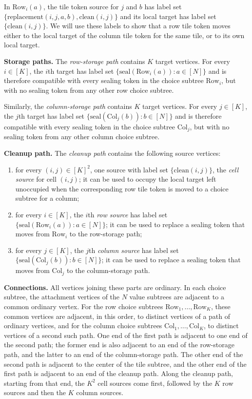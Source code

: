 \documentclass[a4paper,USenglish,thm-restate]{lipics-v2021}
\newcommand{\rowsub}{\mathrm{Row}}
\newcommand{\colsub}{\mathrm{Col}}
\theoremstyle{problemstyle}
\begin{document}
In $\rowsub_i(a)$, the tile token source for $j$ and $b$ has label set
$\{\mathrm{replacement}(i,j,a,b),\mathrm{clean}(i,j)\}$ and its local target
has label set $\{\mathrm{clean}(i,j)\}$. We will use these labels to show
that a row tile token moves either to the local target of the column tile
token for the same tile, or to its own local target.

\smallskip
\noindent\textbf{Storage paths.}
The \emph{row-storage path} contains $K$ target vertices. For every
$i\in[K]$, the $i$th target has label set
$\{\mathrm{seal}(\rowsub_i(a)):a\in[N]\}$ and is therefore compatible with
every sealing token in the choice subtree $\rowsub_i$, but with no sealing
token from any other row choice subtree.

Similarly, the \emph{column-storage path} contains $K$ target vertices. For
every $j\in[K]$, the $j$th target has label set
$\{\mathrm{seal}(\colsub_j(b)):b\in[N]\}$ and is therefore compatible with
every sealing token in the choice subtree $\colsub_j$, but with no sealing
token from any other column choice subtree.

\smallskip
\noindent\textbf{Cleanup path.}
The \emph{cleanup path} contains the following source vertices:
\begin{enumerate}
\item for every $(i,j)\in[K]^2$, one source with label set $\{{\mathrm{clean}(i,j)}\}$, the \emph{cell source} for cell $(i,j)$; it can be used to occupy the local target left unoccupied when the corresponding row tile token is moved to a choice subtree for a column;
\item for every $i\in[K]$, the $i$th \emph{row source} has label set $\{{\mathrm{seal}(\rowsub_i(a)):a\in[N]}\}$; it can be used to replace a sealing token that moves from $\rowsub_i$ to the row-storage path;
\item for every $j\in[K]$, the $j$th \emph{column source} has label set $\{{\mathrm{seal}(\colsub_j(b)):b\in[N]}\}$; it can be used to replace a sealing token that moves from $\colsub_j$ to the column-storage path.
\end{enumerate}

\smallskip
\noindent\textbf{Connections.}
All vertices joining these parts are ordinary. In each choice subtree, the
attachment vertices of the $N$ value subtrees are adjacent to a common
ordinary vertex. For the row choice subtrees $\rowsub_1,\ldots,\rowsub_K$,
these common vertices are adjacent, in this order, to distinct vertices of
a path of ordinary vertices, and for the column choice subtrees
$\colsub_1,\ldots,\colsub_K$, to distinct vertices of a second such path.
One end of the first path is adjacent to one end of the second path; the
former end is also adjacent to an end of the row-storage path, and the
latter to an end of the column-storage path. The other end of the second
path is adjacent to the center of the tile subtree, and the other end of
the first path is adjacent to an end of the cleanup path. Along the cleanup
path, starting from that end, the $K^2$ cell sources come first, followed
by the $K$ row sources and then the $K$ column sources.
\end{document}
